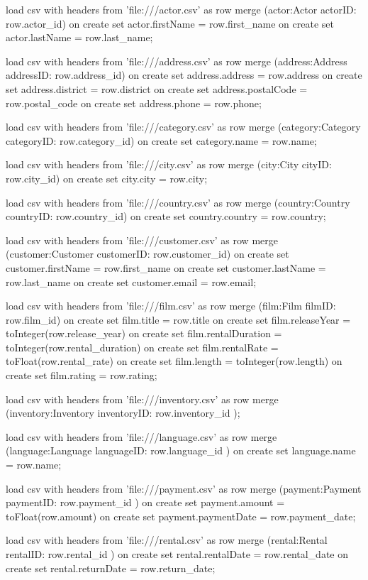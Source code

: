 \begin{cyphercode}
load csv with headers from 'file:///actor.csv' as row 
merge (actor:Actor {actorID: row.actor_id})
on create set actor.firstName = row.first_name 
on create set actor.lastName = row.last_name;

load csv with headers from 'file:///address.csv' as row
merge (address:Address {addressID: row.address_id})
on create set address.address = row.address
on create set address.district = row.district
on create set address.postalCode = row.postal_code
on create set address.phone = row.phone;

load csv with headers from 'file:///category.csv' as row
merge (category:Category {categoryID: row.category_id})
on create set category.name = row.name;

load csv with headers from 'file:///city.csv' as row
merge (city:City {cityID: row.city_id})
on create set city.city = row.city;

load csv with headers from 'file:///country.csv' as row
merge (country:Country { countryID: row.country_id})
on create set country.country = row.country;

load csv with headers from 'file:///customer.csv' as row
merge (customer:Customer { customerID: row.customer_id})
on create set customer.firstName = row.first_name
on create set customer.lastName = row.last_name
on create set customer.email = row.email;

load csv with headers from 'file:///film.csv' as row
merge (film:Film { filmID: row.film_id})
on create set film.title = row.title
on create set film.releaseYear = toInteger(row.release_year)
on create set film.rentalDuration = toInteger(row.rental_duration)
on create set film.rentalRate = toFloat(row.rental_rate)
on create set film.length = toInteger(row.length)
on create set film.rating = row.rating;

load csv with headers from 'file:///inventory.csv' as row
merge (inventory:Inventory { inventoryID: row.inventory_id });

load csv with headers from 'file:///language.csv' as row
merge (language:Language { languageID: row.language_id })
on create set language.name = row.name;

load csv with headers from 'file:///payment.csv' as row
merge (payment:Payment { paymentID: row.payment_id } )
on create set payment.amount = toFloat(row.amount)
on create set payment.paymentDate = row.payment_date;

load csv with headers from 'file:///rental.csv' as row
merge (rental:Rental { rentalID: row.rental_id } )
on create set rental.rentalDate = row.rental_date
on create set rental.returnDate = row.return_date;


\end{cyphercode}
